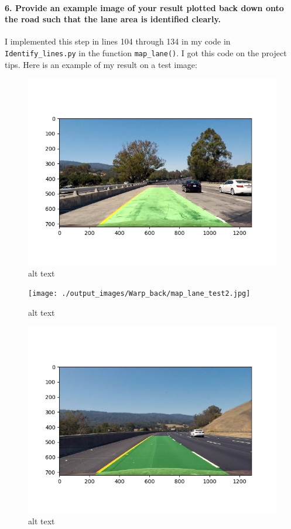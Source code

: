 \documentclass[11pt]{article}
\makeatletter
\def\maxwidth{\ifdim\Gin@nat@width>\linewidth\linewidth
    \else\Gin@nat@width\fi}
\let\Oldincludegraphics\includegraphics
\renewcommand{\includegraphics}[1]{\Oldincludegraphics[width=.8\maxwidth]{#1}}
\makeatother
\begin{document}
\paragraph{6. Provide an example image of your result plotted back down
onto the road such that the lane area is identified
clearly.}\label{provide-an-example-image-of-your-result-plotted-back-down-onto-the-road-such-that-the-lane-area-is-identified-clearly.}

I implemented this step in lines 104 through 134 in my code in
\texttt{Identify\_lines.py} in the function \texttt{map\_lane()}. I got
this code on the project tips. Here is an example of my result on a test
image:

\begin{figure}
\centering
\includegraphics{./output_images/Warp_back/map_lane_test1.jpg}
\caption{alt text}
\end{figure}

\begin{figure}
\centering
\texttt{[image: ./output\_images/Warp\_back/map\_lane\_test2.jpg]}
\caption{alt text}
\end{figure}

\begin{figure}
\centering
\includegraphics{./output_images/Warp_back/map_lane_test3.jpg}
\caption{alt text}
\end{figure}
\end{document}
